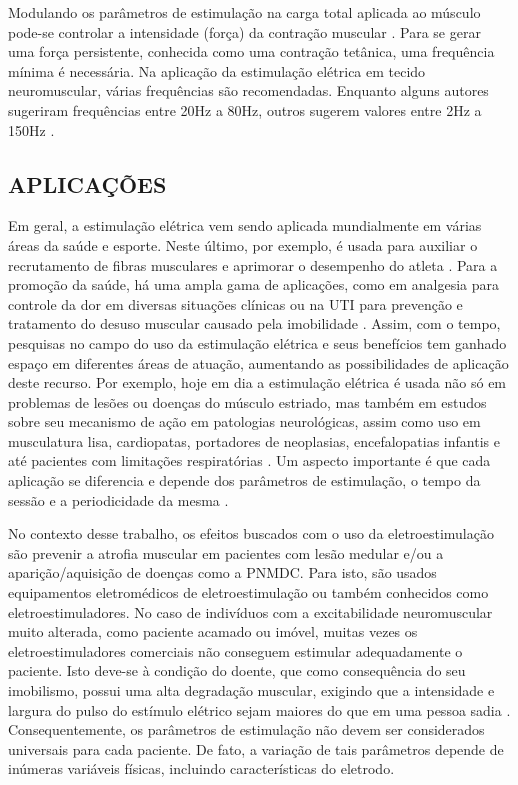 Modulando os parâmetros de estimulação na carga total aplicada ao músculo pode-se controlar a intensidade (força) da contração muscular \cite{Maffiuletti2010PhysiologicalStimulation}. Para se gerar uma força persistente, conhecida como uma contração tetânica, uma frequência mínima é necessária. Na aplicação da estimulação elétrica em tecido neuromuscular, várias frequências são recomendadas. Enquanto alguns autores sugeriram frequências entre 20Hz a 80Hz, outros sugerem valores entre 2Hz a 150Hz \cite{Kitchen2003EletroterapiaEvidencias, Delitto1988ElectricalSurgery}.


\subsection{APLICAÇÕES}
Em geral, a estimulação elétrica vem sendo aplicada mundialmente em várias áreas da saúde e esporte. Neste último, por exemplo, é usada para auxiliar o recrutamento de fibras musculares e aprimorar o desempenho do atleta \cite{Garcia2001ElectrostimulationSport}. Para a promoção da saúde, há uma ampla gama de aplicações, como em analgesia para controle da dor em diversas situações clínicas \cite{Sterin1966LosDolor} ou na \acrshort{UTI} para prevenção e tratamento do desuso muscular causado pela imobilidade \cite{Fernando2017ARevisao}. Assim, com o tempo, pesquisas no campo do uso da estimulação elétrica e seus benefícios tem ganhado espaço em diferentes áreas de atuação, aumentando as possibilidades de aplicação deste recurso. Por exemplo, hoje em dia a estimulação elétrica é usada não só em problemas de lesões ou doenças do músculo estriado, mas também em estudos sobre seu mecanismo de ação em patologias neurológicas, assim como uso em musculatura lisa, cardiopatas, portadores de neoplasias, encefalopatias infantis e até pacientes com limitações respiratórias \cite{Paulo2007EfeitosEsqueletico, Sterin1966LosDolor}. Um aspecto importante é que cada aplicação se diferencia e depende dos parâmetros de estimulação, o tempo da sessão e a periodicidade da mesma \cite{Crepon2008Electroterapia.Electroestimulacion, Naki2011IsParameters, Robinson2002EletrofisiologiaEletrofisiologico}.

No contexto desse trabalho, os efeitos buscados com o uso da eletroestimulação são prevenir a atrofia muscular em pacientes com lesão medular e/ou a aparição/aquisição de doenças como a \acrshort{PNMDC}. Para isto, são usados equipamentos eletromédicos de eletroestimulação ou também conhecidos como eletroestimuladores. 
No caso de indivíduos com a excitabilidade neuromuscular muito alterada, como paciente acamado ou imóvel, muitas vezes os eletroestimuladores comerciais não conseguem estimular adequadamente o paciente. Isto deve-se à condição do doente, que como consequência do seu imobilismo, possui uma alta degradação muscular, exigindo que a intensidade e largura do pulso do estímulo elétrico sejam maiores do que em uma pessoa sadia \cite{Paulo2007EfeitosEsqueletico}. Consequentemente, os parâmetros de estimulação não devem ser considerados universais para cada paciente. De fato, a variação de tais parâmetros depende de inúmeras variáveis físicas, incluindo características do eletrodo. 

